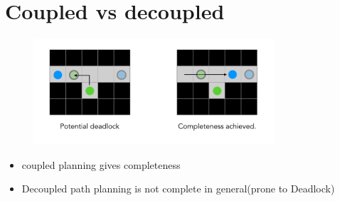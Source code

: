 \documentclass[a4paper]{article}
\begin{document}
    \section{Coupled vs decoupled}
    \begin{figure}[htpb]
                       \centering
                       \includegraphics[width=0.8\textwidth]{cvdpathplanning.png}
                       \caption{}
                       \label{fig:}
                   \end{figure}
    \begin{itemize}
        \item coupled planning gives completeness
        \item Decoupled path planning is not complete in general(prone to Deadlock)
    \end{itemize}
\end{document}
